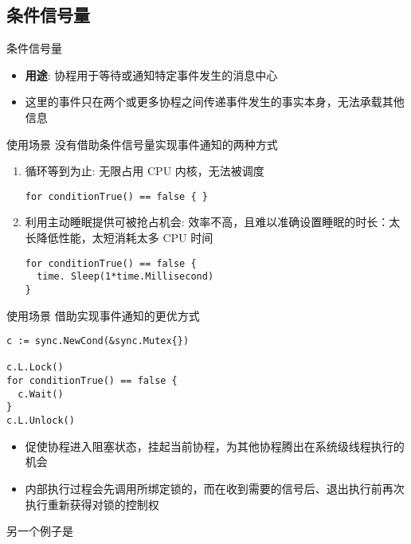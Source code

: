 \subsection{条件信号量\Cond}
\begin{frame}{条件信号量\Cond}
    \begin{itemize}
        \item \textbf{用途}: 协程用于等待或通知特定事件发生的消息中心
        \item 这里的事件只在两个或更多协程之间传递事件发生的事实本身，\alert{无法承载其他信息}
    \end{itemize}
\end{frame}

\begin{frame}[fragile]{使用场景}
   没有借助条件信号量实现事件通知的两种方式
   
   \begin{enumerate}
       \item {}循环等到为止: 无限占用 CPU 内核，\alert{无法被调度}
\begin{lstlisting}
for conditionTrue() == false { }    
\end{lstlisting}
       \item 利用主动睡眠提供可被抢占机会: \alert{效率不高，且难以准确设置睡眠的时长}：太长降低性能，太短消耗太多 CPU 时间    
\begin{lstlisting}
for conditionTrue() == false {
  time. Sleep(1*time.Millisecond)
}
\end{lstlisting}
   \end{enumerate}
\end{frame}

\begin{frame}[fragile]{使用场景}
   借助\Cond 实现事件通知的更优方式
\begin{lstlisting}
c := sync.NewCond(&sync.Mutex{})

c.L.Lock()
for conditionTrue() == false {
  c.Wait()
}
c.L.Unlock()
\end{lstlisting}

\begin{itemize}
    \item {}促使协程进入阻塞状态，挂起当前协程，为其他协程腾出在系统级线程执行的机会
    \item {}内部执行过程会先调用所绑定锁的，而在收到需要的信号后、退出执行前再次执行重新获得对锁的控制权
\end{itemize}

另一个例子是
\end{frame}

